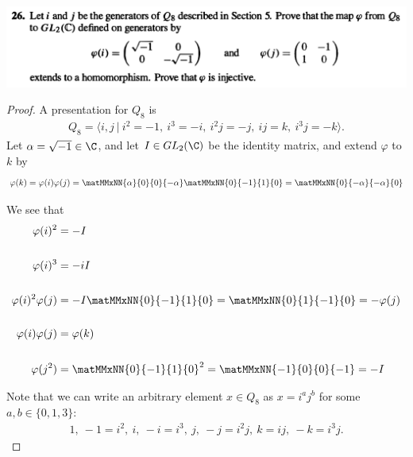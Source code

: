 ~\\~\\
\begin{mdframed}
\includegraphics[width=400pt]{img/abstract-algebra--nf--3-1a71.png}
\end{mdframed}

\begin{proof}
  A presentation for $Q_8$ is
  \begin{align*}
    Q_8 = \big\langle i, j ~\big|~ i^2 = -1, ~ i^3 = -i, ~ i^2j = -j, ~ ij = k, ~ i^3j = -k \big\rangle.
  \end{align*}
  Let $\alpha = \sqrt{-1} \in \C$, and let $I \in GL_2(\C)$ be the identity matrix, and extend
  $\varphi$ to $k$ by
  \begin{align*}
    \varphi(k) &= \varphi(i)\varphi(j) = \matMMxNN{\alpha}{0}
                                 {0}{-\alpha} \matMMxNN{0}{-1}
                                                  {1}{0} = \matMMxNN{0}{-\alpha}
                                                                    {-\alpha}{0} \\
  \end{align*}

 We see that
  \begin{align*}
    \varphi(i)^2 &= -I \\
~\\
    \varphi(i)^3 &= -iI \\
~\\
    \varphi(i)^2\varphi(j) &= -I \matMMxNN{0}{-1}
                             {1}{0} = \matMMxNN{0}{1}
                                               {-1}{0} = -\varphi(j) \\
~\\
    \varphi(i)\varphi(j) &= \varphi(k) \\
~\\
    \varphi(j^2) &= \matMMxNN{0}{-1}
                      {1}{0}^2 = \matMMxNN{-1}{0}
                                          {0}{-1} = -I \\
  \end{align*}


  Note that we can write an arbitrary element $x \in Q_8$ as $x = i^aj^b$ for
  some $a, b \in \{0, 1, 3\}$:
  \begin{align*}
    1,~ -1 = i^2,~ i,~ -i = i^3,~ j,~ -j = i^2j,~ k = ij,~ -k = i^3j.
  \end{align*}




\end{proof}
